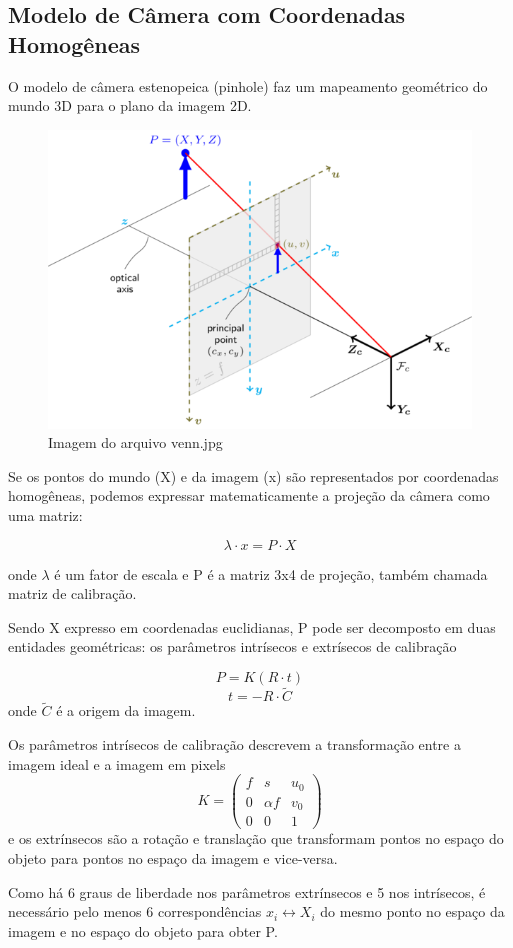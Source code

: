 \documentclass[conference]{IEEEtran}
\begin{document}
\subsection{Modelo de Câmera com Coordenadas Homogêneas}
O modelo de câmera estenopeica (pinhole) faz um mapeamento geométrico do mundo 3D para o plano da imagem 2D.\cite{unicamp}

\begin{figure}[h!]
\begin{center}
\includegraphics[width=0.5\columnwidth]{pinhole.png}
\caption{Imagem do arquivo venn.jpg}
\end{center}
\end{figure}

Se os pontos do mundo (X) e da imagem (x) são representados por coordenadas homogêneas, podemos expressar matematicamente a projeção da câmera como uma matriz\cite{tese}:

\[\lambda \cdot x = P \cdot X\]

onde \(\lambda\) é um fator de escala e P é a matriz 3x4 de projeção, também chamada matriz de calibração.

Sendo X expresso em coordenadas euclidianas, P pode ser decomposto em duas entidades geométricas: os parâmetros intrísecos e extrísecos de calibração\cite{tese}

\[P = K (R\cdot t)\] 
\[t = -R \cdot \widetilde{C}\]
onde \(\widetilde{C}\) é a origem da imagem. \cite{Hartley2004}

Os parâmetros intrísecos de calibração descrevem a transformação entre a imagem ideal e a imagem em pixels
$$
K = \begin{pmatrix} 
f & s & u_0 \\
0 & \alpha f & v_0\\
0 & 0 & 1
\end{pmatrix}
$$
e os extrínsecos são a rotação e translação que transformam pontos no espaço do objeto para pontos no espaço da imagem e vice-versa\cite{tese}.

Como há 6 graus de liberdade nos parâmetros extrínsecos e 5 nos intrísecos, é necessário pelo menos 6 correspondências \({x_i \leftrightarrow X_i}\) do mesmo ponto no espaço da imagem e no espaço do objeto para obter P\cite{tese}. 
\end{document}
